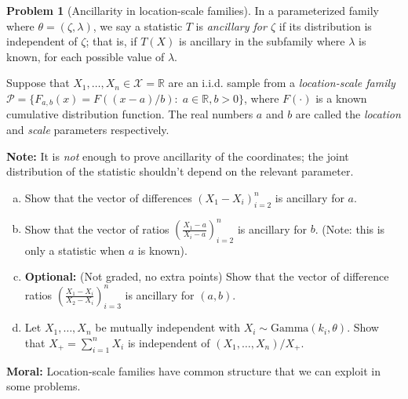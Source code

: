 \documentclass{article}
\newcommand{\cP}{\mathcal{P}}
\newcommand{\cX}{\mathcal{X}}
\newcommand{\RR}{\mathbb{R}}
\newcommand{\optional}{{\bf Optional:} (Not graded, no extra points) }
\theoremstyle{definition}
\newtheorem{problem}{Problem}
\begin{document}
\begin{problem}[Ancillarity in location-scale families]

In a parameterized family where $\theta = (\zeta, \lambda)$, we say a statistic $T$ is {\em ancillary for $\zeta$} if its distribution is independent of $\zeta$; that is, if $T(X)$ is ancillary in the subfamily where $\lambda$ is known, for each possible value of $\lambda$.

Suppose that $X_1,\ldots,X_n\in \cX=\RR$ are an i.i.d. sample from a {\em location-scale family} $\cP = \{F_{a,b}(x) = F((x-a)/b): \; a\in \RR, b>0\}$, where $F(\cdot)$ is a known cumulative distribution function. The real numbers $a$ and $b$ are called the {\em location} and {\em scale} parameters respectively. 

{\bf Note:} It is {\em not} enough to prove ancillarity of the coordinates; the joint distribution of the statistic shouldn't depend on the relevant parameter.
\begin{enumerate}[(a)]
\item Show that the vector of differences $\left(X_1 - X_i\right)_{i = 2}^n$ is ancillary for $a$.


\item Show that the vector of ratios $\left(\frac{X_1 - a}{X_i - a}\right)_{i=2}^n$ is ancillary for $b$. (Note: this is only a statistic when $a$ is known).


\item \optional Show that the vector of difference ratios $\left(\frac{X_1 - X_i}{X_2 - X_i}\right)_{i=3}^n$ is ancillary for $(a,b)$.

\item Let $X_1,\ldots,X_n$ be mutually independent with $X_i \sim \text{Gamma}(k_i, \theta)$. Show that $X_+ = \sum_{i=1}^n X_i$ is independent of $(X_1,\ldots,X_n)/X_+$.


\end{enumerate}

{\bf Moral:} Location-scale families have common structure that we can exploit in some problems.
\end{problem}
\end{document}
